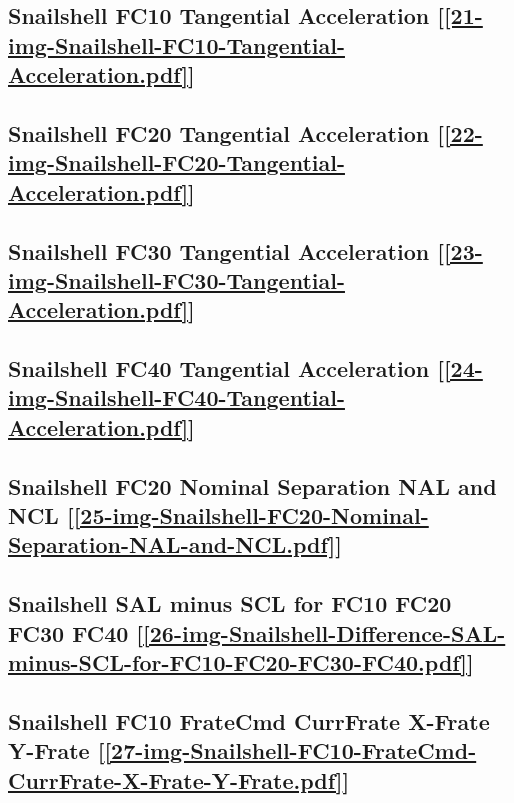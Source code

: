 \subsection       {Snailshell FC10 Tangential Acceleration
	[\ref      {21-img-Snailshell-FC10-Tangential-Acceleration.pdf}] }
\label{ssec-21-img-Snailshell-FC10-Tangential-Acceleration.pdf}

\subsection       {Snailshell FC20 Tangential Acceleration
	[\ref      {22-img-Snailshell-FC20-Tangential-Acceleration.pdf}] }
\label{ssec-22-img-Snailshell-FC20-Tangential-Acceleration.pdf}

\subsection       {Snailshell FC30 Tangential Acceleration
	[\ref      {23-img-Snailshell-FC30-Tangential-Acceleration.pdf}] }
\label{ssec-23-img-Snailshell-FC30-Tangential-Acceleration.pdf}

\subsection       {Snailshell FC40 Tangential Acceleration
	[\ref      {24-img-Snailshell-FC40-Tangential-Acceleration.pdf}] }
\label{ssec-24-img-Snailshell-FC40-Tangential-Acceleration.pdf}

\subsection       {Snailshell FC20 Nominal Separation NAL and NCL
	[\ref      {25-img-Snailshell-FC20-Nominal-Separation-NAL-and-NCL.pdf}] }
\label{ssec-25-img-Snailshell-FC20-Nominal-Separation-NAL-and-NCL.pdf}

\subsection       {Snailshell SAL minus SCL for FC10 FC20 FC30 FC40
	[\ref      {26-img-Snailshell-Difference-SAL-minus-SCL-for-FC10-FC20-FC30-FC40.pdf}] }
\label{ssec-26-img-Snailshell-Difference-SAL-minus-SCL-for-FC10-FC20-FC30-FC40.pdf}


\subsection       {Snailshell FC10 FrateCmd CurrFrate X-Frate Y-Frate
	[\ref      {27-img-Snailshell-FC10-FrateCmd-CurrFrate-X-Frate-Y-Frate.pdf}] }
\label{ssec-27-img-Snailshell-FC10-FrateCmd-CurrFrate-X-Frate-Y-Frate.pdf}

